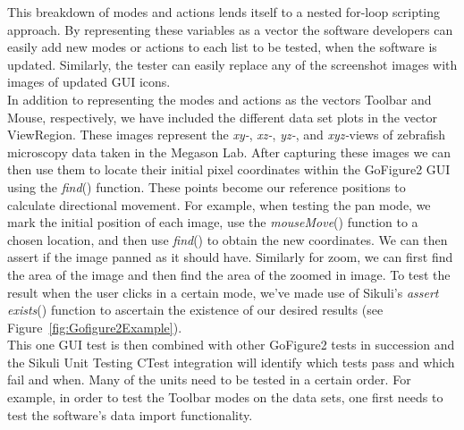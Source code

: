\documentclass{InsightArticle}
\begin{document}
This breakdown of modes and actions lends itself to a nested for-loop scripting
approach. By representing these variables as a vector the software developers
can easily add new modes or actions to each list to be tested, when the software
is updated. Similarly, the tester can easily replace any of the screenshot
images with images of updated GUI icons.\\  

In addition to representing the modes and actions as the vectors Toolbar and
Mouse, respectively, we have included the different data set plots in the
vector ViewRegion. These images represent the \emph{xy-}, \emph{xz-},
\emph{yz-}, and \emph{xyz-}views of zebrafish microscopy data taken in the
Megason Lab. After capturing these images we can then use them to locate their
initial pixel coordinates within the GoFigure2 GUI using the \emph{find}()
function. These points become our reference positions to calculate directional
movement.  For example, when testing the pan mode, we mark the initial position
of each image, use the \emph{mouseMove}() function to a chosen location, and
then use \emph{find}() to obtain the new coordinates. We can then assert if the
image panned as it should have. Similarly for zoom, we can first find the area
of the image and then find the area of the zoomed in image.  To test the result
when the user clicks in a certain mode, we've made use of Sikuli's \emph{assert
exists}() function to ascertain the existence of our desired results (see
Figure~\ref{fig:Gofigure2Example}).\\

This one GUI test is then combined with other GoFigure2 tests in succession and
the Sikuli Unit Testing CTest integration will identify which tests pass and
which fail and when. Many of the units need to be tested in a certain order.
For example, in order to test the Toolbar modes on the data sets, one first
needs to test the software's data import functionality.
\end{document}
